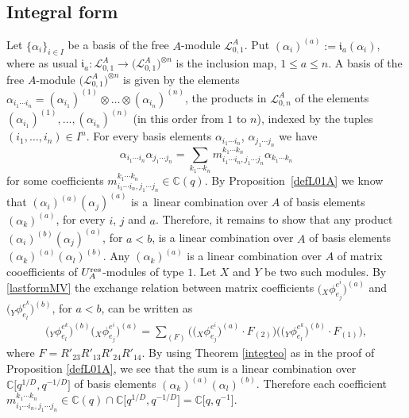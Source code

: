 \documentclass[pdftex]{sigma}%
\numberwithin{equation}{section}
\numberwithin{figure}{section}
\newcommand{\mc}{\mathbb{C}}
\newcommand{\Ll}{{\mathcal L}}
\newcommand{\ra}{\rightarrow}
\begin{document}
\subsection{Integral form} Let $\{\alpha_i\}_{i\in I}$ be a basis of the free $A$-module $\Ll_{0,1}^A$. Put $(\alpha_i)^{(a)} := \mathfrak{i}_a(\alpha_i)$, where as usual $\mathfrak{i}_a\colon \Ll_{0,1}^A\ra \big(\Ll_{0,1}^A\big)^{\otimes n}$ is the inclusion map, $1\leq a\leq n$. A basis of the free $A$-module $\big(\Ll_{0,1}^A\big)^{\otimes n}$ is given by the elements $\alpha_{i_1\cdots i_n} = (\alpha_{i_1})^{(1)} \otimes \dots \otimes(\alpha_{i_n})^{(n)}$, the products in $\Ll_{0,n}^A$ of the elements $(\alpha_{i_1})^{(1)},\dots, (\alpha_{i_n})^{(n)}$ (in this order from $1$ to $n$), indexed by the tuples $(i_1,\dots,i_n)\in I^n$. For every basis elements $\alpha_{i_1\cdots i_n}$, $\alpha_{j_1\cdots j_n}$ we have
\[
\alpha_{i_1\cdots i_n} \alpha_{j_1\cdots j_n} = \sum_{k_1\cdots k_n} m_{i_1\cdots i_n, j_1\cdots j_n}^{k_1\cdots k_n} \alpha_{k_1\cdots k_n}
\]
for some coefficients $m_{i_1\cdots i_n,j_1\cdots j_n}^{k_1\cdots k_n}\in \mc(q)$. By Proposition~\ref{defL01A} we know that $(\alpha_i)^{(a)}(\alpha_j)^{(a)}$ is a~linear combination over $A$ of basis elements $(\alpha_k)^{(a)}$, for every $i$, $j$ and $a$. Therefore, it remains to show that any product $(\alpha_i)^{(b)}(\alpha_j)^{(a)}$, for $a<b$, is a linear combination over $A$ of basis elements $(\alpha_k)^{(a)}(\alpha_l)^{(b)}$. Any $(\alpha_k)^{(a)}$ is a linear combination over $A$ of matrix cooefficients of $U_A^{\rm res}$-modules of type $1$. Let $X$ and $Y$ be two such modules. By \eqref{lastformMV} the exchange relation between matrix coefficients $\big({}_X\phi^{e^i}_{e_j}\big)^{(a)}$ and $\big({}_Y\phi^{e^k}_{e_l}\big)^{(b)}$, for $a<b$, can be written as
 \begin{align*}
\big({}_Y\phi^{e^k}_{e_l}\big)^{(b)}\big({}_X\phi^{e^i}_{e_j}\big)^{(a)} = \sum_{(F)} \big(\big({}_X\phi^{e^i}_{e_j}\big)^{(a)}\cdot F_{(2)}\big)\big(\big({}_Y\phi^{e^k}_{e_l}\big)^{(b)}\cdot F_{(1)}\big),
\end{align*}
where $\textstyle F = R'_{23}R'_{13}R'_{24}R'_{14}$. By using Theorem \ref{integteo} as in the proof of Proposition \ref{defL01A}, we see that the sum is a linear combination over $\mc\big[q^{1/D}, q^{-1/D}\big]$ of basis elements $(\alpha_k)^{(a)}(\alpha_l)^{(b)}$. Therefore each coefficient $m_{i_1\cdots i_n,j_1\cdots j_n}^{k_1\cdots k_n}\in \mc(q)\cap \mc\big[q^{1/D}, q^{-1/D}\big] = \mc\big[q, q^{-1}\big]$.
\end{document}
